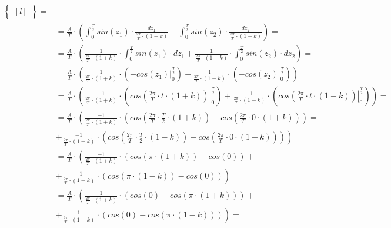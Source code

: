 \begin{task}
\begin{align*}
\begin{Bmatrix*}[l]
\end{Bmatrix*}=\\
&=\frac{A}{T} \cdot \left(\int_{0}^{\frac{T}{2}} sin\left( z_1 \right)\cdot \frac{dz_1}{\frac{2\pi}{T} \cdot \left(1+k\right)}  + \int_{0}^{\frac{T}{2}} sin\left( z_2\right) \cdot \frac{dz_2}{\frac{2\pi}{T} \cdot \left(1-k\right)}\right)=\\
&=\frac{A}{T} \cdot \left(\frac{1}{\frac{2\pi}{T}\cdot \left(1+k\right)} \cdot \int_{0}^{\frac{T}{2}} sin\left( z_1 \right)\cdot dz_1 + \frac{1}{\frac{2\pi}{T} \cdot \left(1-k\right)} \cdot \int_{0}^{\frac{T}{2}} sin\left( z_2\right) \cdot dz_2 \right)=\\
&=\frac{A}{T} \cdot \left(\frac{1}{\frac{2\pi}{T}\cdot \left(1+k\right)} \cdot \left( \left. -cos\left( z_1 \right) \right|_{0}^{\frac{T}{2}} \right) + \frac{1}{\frac{2\pi}{T} \cdot \left(1-k\right)} \cdot \left(\left. -cos\left( z_2\right) \right|_{0}^{\frac{T}{2}} \right) \right)=\\
&=\frac{A}{T} \cdot \left(\frac{-1}{\frac{2\pi}{T}\cdot \left(1+k\right)} \cdot \left( \left. cos\left( \frac{2\pi}{T} \cdot t \cdot \left(1+k\right) \right) \right|_{0}^{\frac{T}{2}} \right) + \frac{-1}{\frac{2\pi}{T} \cdot \left(1-k\right)} \cdot \left(\left. cos\left( \frac{2\pi}{T} \cdot t \cdot \left(1-k\right)\right) \right|_{0}^{\frac{T}{2}} \right) \right)=\\
&=\frac{A}{T} \cdot \left(\frac{-1}{\frac{2\pi}{T}\cdot \left(1+k\right)} \cdot \left( cos\left( \frac{2\pi}{T} \cdot \frac{T}{2} \cdot \left(1+k\right) \right) - cos\left( \frac{2\pi}{T} \cdot 0 \cdot \left(1+k\right) \right) \right) \right.=\\
&\left.+ \frac{-1}{\frac{2\pi}{T} \cdot \left(1-k\right)} \cdot \left( cos\left( \frac{2\pi}{T} \cdot \frac{T}{2} \cdot \left(1-k\right)\right) -  cos\left( \frac{2\pi}{T} \cdot 0 \cdot \left(1-k\right)\right) \right) \right)=\\
&=\frac{A}{T} \cdot \left(\frac{-1}{\frac{2\pi}{T}\cdot \left(1+k\right)} \cdot \left( cos\left(\pi \cdot \left(1+k\right) \right) - cos\left( 0 \right) \right) \right.+\\
&\left.+ \frac{-1}{\frac{2\pi}{T} \cdot \left(1-k\right)} \cdot \left( cos\left(\pi \cdot \left(1-k\right)\right) -  cos\left( 0 \right) \right) \right)=\\
&=\frac{A}{T} \cdot \left(\frac{1}{\frac{2\pi}{T}\cdot \left(1+k\right)} \cdot \left( cos\left( 0 \right) - cos\left(\pi \cdot \left(1+k\right) \right) \right) \right.+\\
&\left.+ \frac{1}{\frac{2\pi}{T} \cdot \left(1-k\right)} \cdot \left( cos\left( 0 \right) - cos\left(\pi \cdot \left(1-k\right)\right) \right) \right)=\\

\end{align*}
\end{task}
